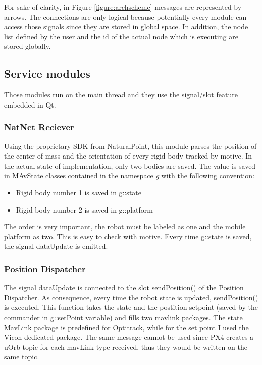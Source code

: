 For sake of clarity, in Figure \ref{figure:archscheme} messages are represented by arrows. The connections are only logical because potentially every module can access those signals since they are stored in global space. In addition, the node list defined by the user and the id of the actual node which is executing are stored globally.

\subsection{Service modules}

Those modules run on the main thread and they use the signal/slot feature embedded in Qt. 

\subsubsection*{NatNet Reciever}

Using the proprietary SDK from NaturalPoint, this module parses the position of the center of mass and the orientation of every rigid body tracked by motive. In the actual state of implementation, only two bodies are saved. The value is saved in MAvState classes contained in the  namespace \textit{g} with the following convention: \begin{itemize}
\item Rigid body number 1 is saved in g::state 
\item Rigid body number 2 is saved in g::platform
\end{itemize}
The order is very important, the robot must be labeled as one and the mobile platform as two. This is easy to check with motive. Every time g::state is saved, the signal dataUpdate is emitted.
\subsubsection*{Position Dispatcher}

The signal dataUpdate is connected to the slot sendPosition() of the Position Dispatcher. As consequence, every time the robot state is updated, sendPosition() is executed. This function takes the state and the postition setpoint (saved by the commander in g::setPoint variable) and fills two mavlink packages. The state MavLink package is predefined for Optitrack, while for the set point I used the Vicon dedicated package. The same message cannot be used since PX4 creates a uOrb topic for each mavLink type received, thus they would be written on the same topic. 

